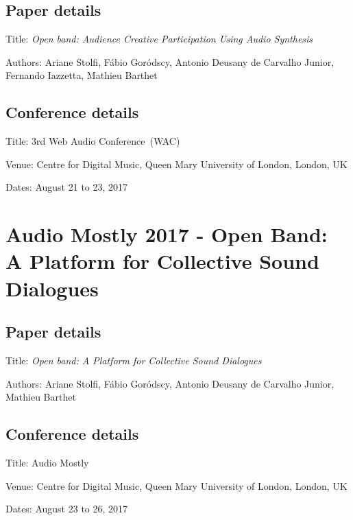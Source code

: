 \subsection*{Paper details}

Title: \textit{Open band: Audience Creative Participation Using Audio Synthesis}

Authors: Ariane Stolfi, Fábio Goródscy, Antonio Deusany de Carvalho Junior, Fernando Iazzetta, Mathieu Barthet

\subsection*{Conference details}

Title: 3rd Web Audio Conference~(WAC)

Venue: Centre for Digital Music, Queen Mary University of London, London, UK

Dates: August 21 to 23, 2017



\section{Audio Mostly 2017 - Open Band: A Platform for Collective Sound Dialogues}
\label{ape:paperam2017}

\subsection*{Paper details}

Title: \textit{Open band: A Platform for Collective Sound Dialogues}

Authors: Ariane Stolfi, Fábio Goródscy, Antonio Deusany de Carvalho Junior, Mathieu Barthet

\subsection*{Conference details}

Title: Audio Mostly

Venue: Centre for Digital Music, Queen Mary University of London, London, UK
 
Dates: August 23 to 26, 2017


